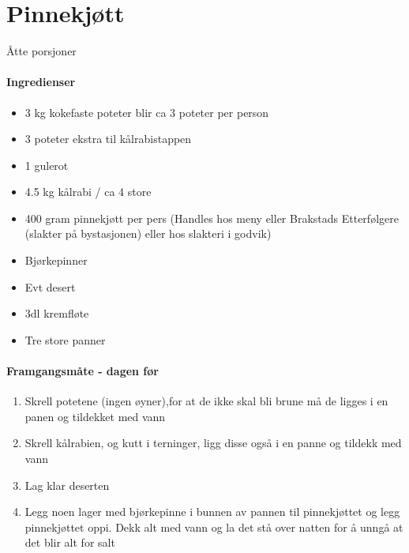 \section{﻿Pinnekjøtt}
Åtte porsjoner

\paragraph{Ingredienser}
\begin{itemize}[noitemsep]
	\item 3 kg kokefaste poteter blir ca 3 poteter per person
	\item 3 poteter ekstra til kålrabistappen
	\item 1 gulerot
	\item 4.5 kg kålrabi / ca 4 store
	\item 400 gram pinnekjøtt per pers (Handles hos meny eller Brakstads Etterfølgere (slakter på bystasjonen) eller hos slakteri i godvik)
	\item Bjørkepinner
	\item Evt desert
	\item 3dl kremfløte
	\item Tre store panner
\end{itemize}

\paragraph{Framgangsmåte - dagen før}
\begin{enumerate}[noitemsep]
	\item Skrell potetene (ingen øyner),for at de ikke skal bli brune må de ligges i en panen og tildekket med vann
	\item Skrell kålrabien, og kutt i terninger, ligg disse også i en panne og tildekk med vann
	\item Lag klar deserten
	\item Legg noen lager med bjørkepinne i bunnen av pannen til pinnekjøttet og legg pinnekjøttet oppi. Dekk alt med vann og la det stå over natten for å unngå at det blir alt for salt
\end{enumerate}

